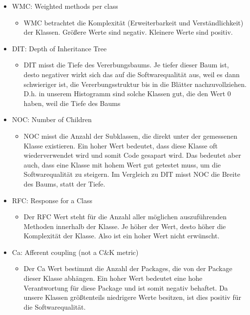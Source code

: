 \documentclass{scrreprt}
\begin{document}
\begin{itemize}
\item WMC: Weighted methods per class
    \begin{itemize}
    \item WMC betrachtet die Komplexität (Erweiterbarkeit und Verständlichkeit) der Klassen. Größere Werte sind negativ. Kleinere Werte sind positiv.
    \end{itemize}

\item DIT: Depth of Inheritance Tree
    \begin{itemize}
    \item DIT misst die Tiefe des Vererbungsbaums. Je tiefer dieser Baum ist, desto negativer wirkt sich das auf die Softwarequalität aus, weil es dann schwieriger ist, die Vererbungsstruktur bis in die Blätter nachzuvollziehen. D.h. in unserem Histogramm sind solche Klassen gut, die den Wert 0 haben, weil die Tiefe des Baums
    \end{itemize}

\item NOC: Number of Children
    \begin{itemize}
    \item NOC misst die Anzahl der Subklassen, die direkt unter der gemessenen Klasse existieren. Ein hoher Wert bedeutet, dass diese Klasse oft wiederverwendet wird und somit Code gesapart wird. Das bedeutet aber auch, dass eine Klasse mit hohem Wert gut getestet muss, um die Softwarequalität zu steigern. Im Vergleich zu DIT misst NOC die Breite des Baums, statt der Tiefe.
    \end{itemize}

\item RFC: Response for a Class
    \begin{itemize}
    \item Der RFC Wert steht für die Anzahl aller möglichen auszuführenden Methoden innerhalb der Klasse. Je höher der Wert, desto höher die Komplexität der Klasse. Also ist ein hoher Wert nicht erwünscht.
    \end{itemize}

\item Ca: Afferent coupling (not a C\&K metric)
    \begin{itemize}
    \item Der Ca Wert bestimmt die Anzahl der Packages, die von der Package dieser Klasse abhängen. Ein hoher Wert bedeutet eine hohe Verantwortung für diese Package und ist somit negativ behaftet. Da unsere Klassen größtenteils niedrigere Werte besitzen, ist dies positiv für die Softwarequalität.
    \end{itemize}


\end{itemize}
\end{document}
